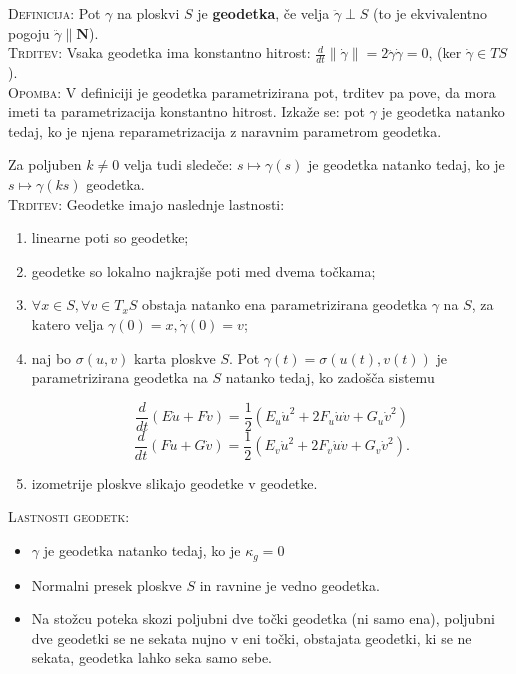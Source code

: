 \documentclass[8pt,a4paper]{amsart}
\theoremstyle{definition} %
\theoremstyle{plain} %
\begin{document}
\textsc{Definicija: }Pot $\gamma$ na ploskvi $S$ je \textbf{geodetka}, če velja $\ddot{\gamma} \perp S$ (to je ekvivalentno pogoju $\ddot{\gamma} \parallel \textbf{N}$).
\\

\textsc{Trditev:} Vsaka geodetka ima konstantno hitrost: $\frac{d}{dt} \| \dot{\gamma} \| = 2\ddot{\gamma}\dot{\gamma} = 0$, (ker $\dot{\gamma} \in TS$).
\\

\textsc{Opomba: }V definiciji je geodetka parametrizirana pot, trditev pa pove, da mora imeti ta parametrizacija konstantno hitrost. Izkaže se: pot $\gamma$ je geodetka natanko tedaj, ko je njena reparametrizacija z naravnim parametrom geodetka.

Za poljuben $k \neq 0$ velja tudi sledeče: $s \mapsto \gamma (s)$ je geodetka natanko tedaj, ko je $s \mapsto \gamma (ks)$ geodetka.
\\

\textsc{Trditev: }Geodetke imajo naslednje lastnosti:

\begin{enumerate}

\item linearne poti so geodetke;

\item geodetke so lokalno najkrajše poti med dvema točkama;

\item $\forall x \in S, \forall v \in T_xS$ obstaja natanko ena parametrizirana geodetka $\gamma$ na $S$, za katero velja $\gamma (0) = x, \dot{\gamma} (0)=v$;

\item naj bo $\sigma (u,v)$ karta ploskve $S$. Pot $\gamma (t) = \sigma (u(t),v(t))$ je parametrizirana geodetka na $S$ natanko tedaj, ko zadošča sistemu

$$
\frac{d}{dt}(E\dot{u} + F\dot{v}) = \frac{1}{2}(E_u \dot{u}^2+2F_u\dot{u}\dot{v} + G_u\dot{v}^2)
$$
$$
\frac{d}{dt}(F\dot{u} + G\dot{v}) = \frac{1}{2}(E_v \dot{u}^2+2F_v\dot{u}\dot{v} + G_v\dot{v}^2).
$$

\item izometrije ploskve slikajo geodetke v geodetke.

\end{enumerate}

\textsc{Lastnosti geodetk: }

\begin{itemize}

\item $\gamma$ je geodetka natanko tedaj, ko je $\kappa_g = 0$

\item Normalni presek ploskve $S$ in ravnine je vedno geodetka.

\item Na stožcu poteka skozi poljubni dve točki geodetka (ni samo ena), poljubni dve geodetki se ne sekata nujno v eni točki, obstajata geodetki, ki se ne sekata, geodetka lahko seka samo sebe.

\end{itemize}
\end{document}
